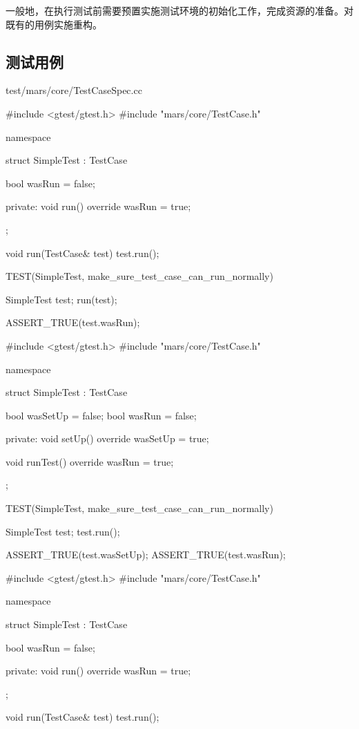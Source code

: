 \begin{content}

一般地，在执行测试前需要预置实施测试环境的初始化工作，完成资源的准备。对既有的用例实施重构。

\subsection{测试用例}

\begin{topdiff}{test/mars/core/TestCaseSpec.cc}
 \begin{minicpp}
#include <gtest/gtest.h>
#include "mars/core/TestCase.h"

namespace {
  struct SimpleTest : TestCase {
    bool wasRun = false;

  private:
    void run() override {
      wasRun = true;
    }
  };

  void run(TestCase& test) {
    test.run();
  }
}

TEST(SimpleTest, make_sure_test_case_can_run_normally) {
  SimpleTest test;
  run(test);

  ASSERT_TRUE(test.wasRun);
}
 \end{minicpp}
\tcblower
 \begin{minicpp}
#include <gtest/gtest.h>
#include "mars/core/TestCase.h"

namespace {
  struct SimpleTest : TestCase {
    bool wasSetUp = false;
    bool wasRun = false;

  private:
    void setUp() override {
      wasSetUp = true;
    }

    void runTest() override {
      wasRun = true;
    }
  };
}

TEST(SimpleTest, make_sure_test_case_can_run_normally) {
  SimpleTest test;
  test.run();

  ASSERT_TRUE(test.wasSetUp);
  ASSERT_TRUE(test.wasRun);
}
 \end{minicpp} 
\end{topdiff}

\begin{lastdiff}
 \begin{c++}
#include <gtest/gtest.h>
#include "mars/core/TestCase.h"

namespace {
  struct SimpleTest : TestCase {
    bool wasRun = false;

  private:
    void run() override {
      wasRun = true;
    }
  };

  void run(TestCase& test) {
    test.run();
  }
}


\end{c++}
\end{lastdiff}
\end{content}

